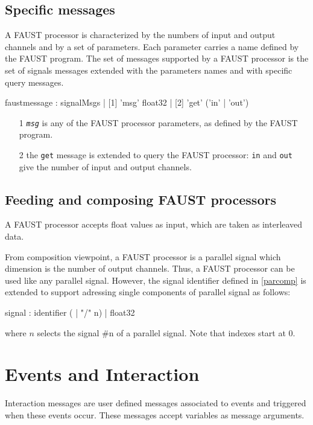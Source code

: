 \documentclass[a4paper,twoside]{report}
\newcommand{\toplevel}[1]	{\chapter{#1}}
\newcommand{\sublevel}[1]	{\section{#1}}
\newcommand{\OSC}[1]		{\texttt{#1}}
\begin{document}
\sublevel{Specific messages}
\label{faustmsg}
A FAUST processor is characterized by the numbers of input and output channels and by a set of parameters. Each parameter carries a name defined by the FAUST program. The set of messages supported by a FAUST processor is the set of signals messages extended with the parameters names and with specific query messages. 

\begin{rail}
faustmessage : signalMsgs
			 | [1] 'msg' float32
			 | [2] 'get' ('in' | 'out')
\end{rail}

\begin{itemize}
\item [1] \OSC{\emph{msg}} is any of the FAUST processor parameters, as defined by the FAUST program.
\item [2] the \OSC{get} message is extended to query the FAUST processor: \OSC{in} and \OSC{out} give the number of input and output channels.
\end{itemize}


\sublevel{Feeding and composing FAUST processors}
\label{composefaust}

A FAUST processor accepts float values as input, which are taken as interleaved data.

From composition viewpoint, a FAUST processor is a parallel signal which dimension is the number of output channels. 
Thus, a FAUST processor can be used like any parallel signal. However, the signal identifier defined in \ref{parcomp} is extended to support adressing single components of parallel signal as follows:
\begin{rail}
signal :  
		  identifier ( | "/" n)
		| float32
\end{rail}
where $n$ selects the signal \#n of a parallel signal. Note that indexes start at 0.


\toplevel{Events and Interaction}
\label{interaction}

Interaction messages are user defined messages associated to events and triggered when these events occur. These messages accept variables as message arguments.
\end{document}
